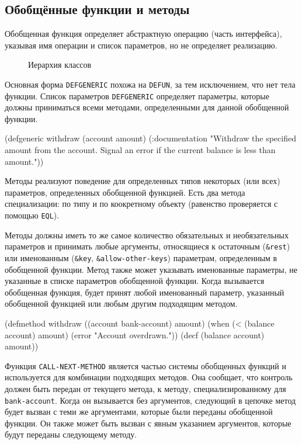 \subsection{Обобщённые функции и методы}
Обобщенная функция определяет абстрактную операцию (часть интерфейса), указывая имя операции и список параметров, но не определяет реализацию. 

\begin{figure}[h!]
  \centering
  \caption{Иерархия классов}
\end{figure}

Основная форма \lstinline{DEFGENERIC} похожа на \lstinline{DEFUN}, за тем исключением, что нет тела функции. Список параметров \lstinline{DEFGENERIC} определяет параметры, которые должны приниматься всеми методами, определенными для данной обобщенной функции.
\begin{cllst}{}{}
(defgeneric withdraw (account amount)
    (:documentation "Withdraw the specified amount from the account.
  Signal an error if the current balance is less than amount."))
\end{cllst}

Методы реализуют поведение для определенных типов некоторых (или всех) параметров, определенных обобщенной функцией. Есть два метода специализации: по типу и по коокретному объекту (равенство проверяется с помощью \lstinline{EQL}).

Методы должны иметь то же самое количество обязательных и необязательных параметров и принимать любые аргументы, относящиеся к остаточным (\lstinline{&rest}) или именованным (\lstinline{&key}, \lstinline{&allow-other-keys}) параметрам, определенным в обобщенной функции. Метод также может указывать именованные параметры, не указанные в списке параметров обобщенной функции. Когда вызывается обобщенная функция, будет принят любой именованный параметр, указанный обобщенной функцией или любым другим подходящим методом.
\begin{cllst}{}{}
(defmethod withdraw ((account bank-account) amount)
    (when (< (balance account) amount)
      (error "Account overdrawn."))
    (decf (balance account) amount))
\end{cllst}

Функция \lstinline{CALL-NEXT-METHOD} является частью системы обобщенных функций и используется для комбинации подходящих методов. Она сообщает, что контроль должен быть передан от текущего метода, к методу, специализированному для \lstinline{bank-account}. Когда он вызывается без аргументов, следующий в цепочке метод будет вызван с теми же аргументами, которые были переданы обобщенной функции. Он также может быть вызван с явным указанием аргументов, которые будут переданы следующему методу.

